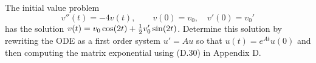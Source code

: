 

The initial value problem
\[
v''(t) = -4v(t), \qquad v(0) = v_0,\quad v'(0) = v_0'
\]
has the solution $v(t) = v_0\cos(2t) + \frac{1}{2} v_0' \sin(2t)$.  Determine this
solution by rewriting the ODE as a first order system $u' = Au$ so that
$u(t) = e^{At}u(0)$ and then computing the matrix exponential using (D.30)
in Appendix D.


